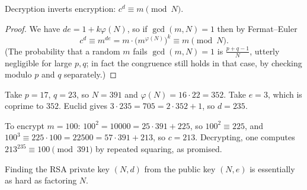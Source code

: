 \begin{center}
\end{center}

\begin{proposition}
	Decryption inverts encryption: $c^d \equiv m\pmod N$.
\end{proposition}

\begin{proof}
	We have $de = 1+k\varphi(N)$, so if $\gcd(m,N)=1$ then by Fermat--Euler
	$$c^d \equiv m^{de} = m\cdot\bigl(m^{\varphi(N)}\bigr)^k\equiv m\pmod N.$$
	(The probability that a random $m$ fails $\gcd(m,N)=1$ is $\frac{p+q-1}{N}$, utterly negligible for large $p,q$; in fact the congruence still holds in that case, by checking modulo $p$ and $q$ separately.)
\end{proof}

\begin{example}
	Take $p = 17$, $q = 23$, so $N = 391$ and $\varphi(N) = 16\cdot22 = 352$. Take $e = 3$, which is coprime to $352$. Euclid gives $3\cdot235 = 705 = 2\cdot352+1$, so $d = 235$.

	To encrypt $m = 100$: $100^2 = 10000 = 25\cdot391+225$, so $100^2\equiv225$, and $100^3\equiv225\cdot100 = 22500 = 57\cdot391+213$, so $c = 213$. Decrypting, one computes $213^{235}\equiv100\pmod{391}$ by repeated squaring, as promised.
\end{example}

\begin{corollary}\label{cor:rsahard}
	Finding the RSA private key $(N,d)$ from the public key $(N,e)$ is essentially as hard as factoring $N$.
\end{corollary}


